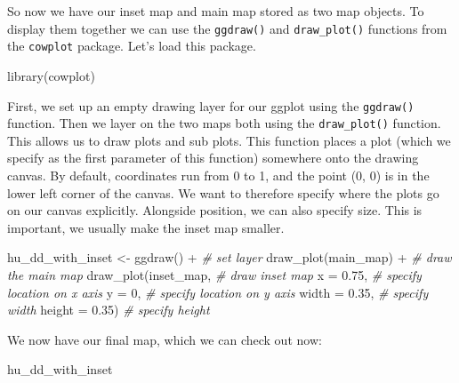 \documentclass[
]{book}
\makeatletter
\newenvironment{Shaded}{\begin{snugshade}}{\end{snugshade}}
\newcommand{\AttributeTok}[1]{\textcolor[rgb]{0.61,0.61,0.61}{#1}}
\newcommand{\CommentTok}[1]{\textcolor[rgb]{0.37,0.37,0.37}{\textit{#1}}}
\newcommand{\DecValTok}[1]{\textcolor[rgb]{0.06,0.06,0.06}{#1}}
\newcommand{\FloatTok}[1]{\textcolor[rgb]{0.06,0.06,0.06}{#1}}
\newcommand{\FunctionTok}[1]{\textcolor[rgb]{0,0,0}{#1}}
\newcommand{\NormalTok}[1]{#1}
\newcommand{\OtherTok}[1]{\textcolor[rgb]{0.37,0.37,0.37}{#1}}
\newcommand{\SpecialCharTok}[1]{\textcolor[rgb]{0,0,0}{#1}}
\newenvironment{kframe}{%
\medskip{}
\setlength{\fboxsep}{.8em}
 \def\at@end@of@kframe{}%
 \ifinner\ifhmode%
  \def\at@end@of@kframe{\end{minipage}}%
  \begin{minipage}{\columnwidth}%
 \fi\fi%
 \def\FrameCommand##1{\hskip\@totalleftmargin \hskip-\fboxsep
 \colorbox{shadecolor}{##1}\hskip-\fboxsep
     \hskip-\linewidth \hskip-\@totalleftmargin \hskip\columnwidth}%
 \MakeFramed {\advance\hsize-\width
   \@totalleftmargin\z@ \linewidth\hsize
   \@setminipage}}%
 {\par\unskip\endMakeFramed%
 \at@end@of@kframe}
\renewenvironment{Shaded}{\begin{kframe}}{\end{kframe}}
\makeatother
\begin{document}
So now we have our inset map and main map stored as two map objects. To display them together we can use the \texttt{ggdraw()} and \texttt{draw\_plot()} functions from the \texttt{cowplot} package. Let's load this package.

\begin{Shaded}
\begin{Highlighting}[]
\FunctionTok{library}\NormalTok{(cowplot)}
\end{Highlighting}
\end{Shaded}

First, we set up an empty drawing layer for our ggplot using the \texttt{ggdraw()} function. Then we layer on the two maps both using the \texttt{draw\_plot()} function. This allows us to draw plots and sub plots. This function places a plot (which we specify as the first parameter of this function) somewhere onto the drawing canvas. By default, coordinates run from 0 to 1, and the point (0, 0) is in the lower left corner of the canvas. We want to therefore specify where the plots go on our canvas explicitly. Alongside position, we can also specify size. This is important, we usually make the inset map smaller.

\begin{Shaded}
\begin{Highlighting}[]
\NormalTok{hu\_dd\_with\_inset }\OtherTok{\textless{}{-}} \FunctionTok{ggdraw}\NormalTok{() }\SpecialCharTok{+}  \CommentTok{\# set layer}
  \FunctionTok{draw\_plot}\NormalTok{(main\_map) }\SpecialCharTok{+}  \CommentTok{\# draw the main map}
  \FunctionTok{draw\_plot}\NormalTok{(inset\_map,   }\CommentTok{\# draw inset map}
            \AttributeTok{x =} \FloatTok{0.75}\NormalTok{,    }\CommentTok{\# specify location on x axis}
            \AttributeTok{y =} \DecValTok{0}\NormalTok{,    }\CommentTok{\# specify location on y axis}
            \AttributeTok{width =} \FloatTok{0.35}\NormalTok{,    }\CommentTok{\# specify width}
            \AttributeTok{height =} \FloatTok{0.35}\NormalTok{)   }\CommentTok{\# specify height}
\end{Highlighting}
\end{Shaded}

We now have our final map, which we can check out now:

\begin{Shaded}
\begin{Highlighting}[]
\NormalTok{hu\_dd\_with\_inset}
\end{Highlighting}
\end{Shaded}
\end{document}
